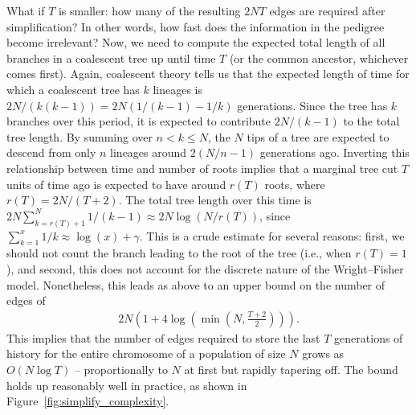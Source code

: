 \documentclass{article}
\begin{document}
What if $T$ is smaller:
how many of the resulting $2NT$ edges are required after simplification?
In other words, how fast does the information in the pedigree become irrelevant?
Now, we need to compute the expected total length of all branches in a coalescent tree
up until time $T$ (or the common ancestor, whichever comes first).
Again, coalescent theory tells us that
the expected length of time for which a coalescent tree has $k$ lineages
is $2N/(k(k-1)) = 2N(1/(k-1) - 1/k)$ generations.
Since the tree has $k$ branches over this period,
it is expected to contribute $2N/(k-1)$ to the total tree length.
By summing over $n < k \le N$,
the $N$ tips of a tree are expected to descend from only $n$ lineages
around $2(N/n - 1)$ generations ago.
Inverting this relationship between time and number of roots
implies that a marginal tree cut $T$ units of time ago
is expected to have around $r(T)$ roots, where $r(T) = 2N/(T+2)$.
The total tree length over this time is
$2N \sum_{k=r(T)+1}^N 1/(k-1) \approx 2 N \log(N/r(T))$,
since $\sum_{k=1}^x 1/k \approx \log(x) + \gamma$.
This is a crude estimate for several reasons:
first, we should not count the branch leading to the root of the tree (i.e., when $r(T)=1$),
and second, this does not account for the discrete nature of the Wright--Fisher model.
Nonetheless, this leads as above to an upper bound on the number of edges of
\begin{align}
    \label{eqn:edge_bound}
    2 N \left( 1 + 4 \log\left( \min\left(N, \frac{T+2}{2}\right) \right)\right) .
\end{align}
This implies that the number of edges required to store the last $T$ generations
of history for the entire chromosome of a population of size $N$
grows as $O(N \log T)$ -- proportionally to $N$ at first but rapidly tapering off.
The bound holds up reasonably well in practice,
as shown in Figure~\ref{fig:simplify_complexity}.
\end{document}
